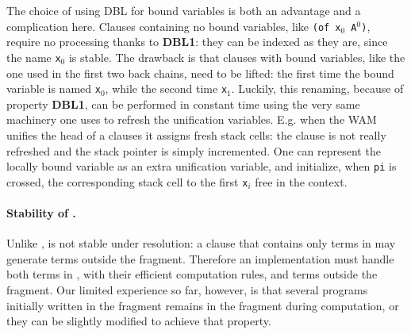 \documentclass{llncs}
\begin{document}
The choice of using DBL for bound variables is both an advantage and a
complication here.
Clauses containing no bound variables, like
\verb+(of x+$_0$\verb+ A+$^0$\verb+)+, require no processing thanks to
\textbf{DBL1}: they can be indexed as they are, since the name \verb+x+$_0$
is stable.
The drawback is that clauses with bound variables, like the one 
used in the first two back chains, need to be lifted: the first time the
bound variable is named \verb+x+$_0$,
while the second time \verb+x+$_1$.
Luckily, this renaming, because of property \textbf{DBL1},
can be performed in constant time using the very same machinery one uses to
refresh the unification variables.
E.g. when the WAM unifies the head of a clauses it assigns 
fresh stack cells: the clause is not really refreshed and the stack
pointer is simply incremented. One can represent the locally bound variable as
an extra unification variable, and initialize, when \verb+pi+ is crossed, the
corresponding stack cell to the first \verb+x+$_i$ free in the context.

\paragraph{Stability of \rff{}.}
Unlike \Ll{}, \rff{} is not stable under \lp{} resolution: a clause that
contains only terms in \rff{} may generate terms outside the fragment.
Therefore an implementation must handle both terms in \rff{}, with their
efficient computation rules, and terms outside the fragment. Our limited
experience so far, however, is that several programs initially written in the
fragment remains in the fragment during computation, or they can be slightly
modified to achieve that property.
\end{document}
